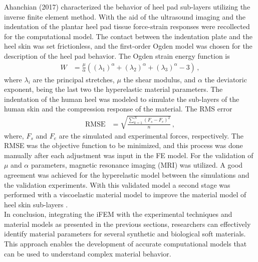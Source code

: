 Ahanchian (2017) characterized the behavior of heel pad sub-layers utilizing the inverse finite element method.
With the aid of the ultrasound imaging and the indentation of the plantar heel pad tissue force-strain responses were recollected 
for the computational model. The contact between the indentation plate and the heel skin was set frictionless, and the first-order 
Ogden model was chosen for the description of the heel pad behavior. The Ogden strain energy function is
\begin{align}
        W &= \frac{\mu}{\alpha}((\lambda_1)^{\alpha} + (\lambda_2)^{\alpha} + (\lambda_3)^{\alpha} - 3) \,,
\end{align}
where $\lambda_i$ are the principal stretches, $\mu$ the shear modulus, and $\alpha$ the deviatoric exponent, being the last two
the hyperelastic material parameters. 
The indentation of the human heel was modeled to simulate the sub-layers of the human skin and the compression response of the material.
The RMS error 
\begin{align}
        \text{RMSE} &= \sqrt{\frac{\sum_{k=1}^N (F_s - F_e)^2}{n} }\,,
\end{align}
where, $F_s$ and $F_e$ are the simulated and experimental forces, respectively. The RMSE was the objective function to be minimized, 
and this process was done manually after each adjustment was input in the FE model. 
For the validation of  $\mu$ and $\alpha$ parameters, magnetic resonance imaging (MRI) was utilized.
A good agreement was achieved for the hyperelastic model between the simulations and the validation experiments. With this validated model 
a second stage was performed with a viscoelastic material model to improve the material model of heel skin sub-layers \cite{Ahanchian2017}.\\

In conclusion, integrating the iFEM with the experimental techniques and material models as presented in the previous sections, 
researchers can effectively identify material parameters for several synthetic and biological soft materials. 
This approach enables the development of accurate computational models that can be used to understand complex material behavior. 

